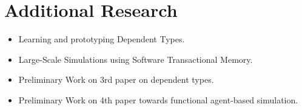 \section{Additional Research}
\begin{itemize}
	\item Learning and prototyping Dependent Types.
	\item Large-Scale Simulations using Software Transactional Memory.
	\item Preliminary Work on 3rd paper on dependent types.
	\item Preliminary Work on 4th paper towards functional agent-based simulation.
\end{itemize}
